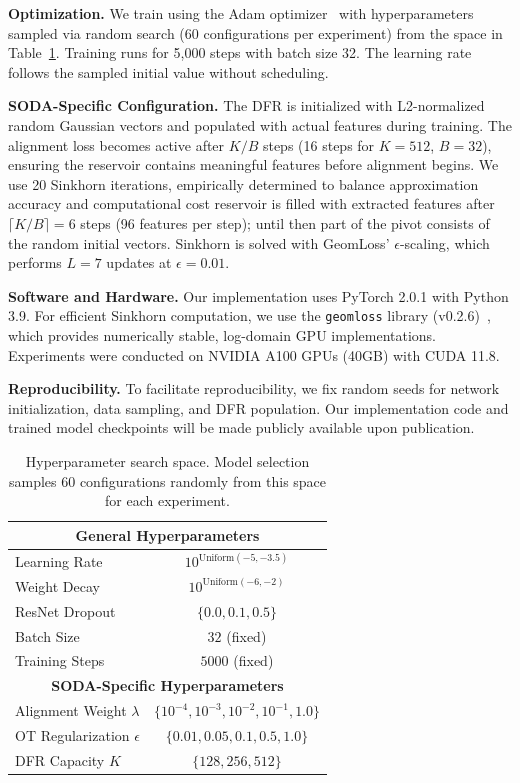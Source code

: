 \documentclass[preprint,12pt]{elsarticle}
\providecommand{\DIFadd}[1]{{\protect\color{blue} \sf #1}} %
\providecommand{\DIFdel}[1]{{\protect\color{red} \scriptsize #1}} %
\providecommand{\DIFaddbegin}{} %
\providecommand{\DIFaddend}{} %
\providecommand{\DIFdelbegin}{} %
\providecommand{\DIFdelend}{} %
\newcommand{\DIFscaledelfig}{0.5}
\newlength{\DIFdelgraphicswidth} %
\newlength{\DIFdelgraphicsheight} %
\newcommand{\DIFaddincludegraphics}[2][]{{\color{blue}\fbox{\DIFOincludegraphics[#1]{#2}}}} %
\newcommand{\DIFdelincludegraphics}[2][]{%
\sbox{\DIFdelgraphicsbox}{\DIFOincludegraphics[#1]{#2}}%
\settoboxwidth{\DIFdelgraphicswidth}{\DIFdelgraphicsbox} %
\settoboxtotalheight{\DIFdelgraphicsheight}{\DIFdelgraphicsbox} %
\scalebox{\DIFscaledelfig}{%
\parbox[b]{\DIFdelgraphicswidth}{\usebox{\DIFdelgraphicsbox}\\[-\baselineskip] \rule{\DIFdelgraphicswidth}{0em}}\llap{\resizebox{\DIFdelgraphicswidth}{\DIFdelgraphicsheight}{%
\setlength{\unitlength}{\DIFdelgraphicswidth}%
\begin{picture}(1,1)%
\thicklines\linethickness{2pt} %
{\color[rgb]{1,0,0}\put(0,0){\framebox(1,1){}}}%
{\color[rgb]{1,0,0}\put(0,0){\line( 1,1){1}}}%
{\color[rgb]{1,0,0}\put(0,1){\line(1,-1){1}}}%
\end{picture}%
}\hspace*{3pt}}} %
} %
\DeclareRobustCommand{\DIFaddbegin}{\DIFOaddbegin \let\includegraphics\DIFaddincludegraphics} %
\DeclareRobustCommand{\DIFaddend}{\DIFOaddend \let\includegraphics\DIFOincludegraphics} %
\DeclareRobustCommand{\DIFdelbegin}{\DIFOdelbegin \let\includegraphics\DIFdelincludegraphics} %
\DeclareRobustCommand{\DIFdelend}{\DIFOaddend \let\includegraphics\DIFOincludegraphics} %
\begin{document}
\textbf{Optimization.} We train using the Adam optimizer~\citep{kingma2014adam} with hyperparameters sampled via random search (60 configurations per experiment) from the space in Table~\ref{tab:hparams}. Training runs for 5,000 steps with batch size 32. The learning rate follows the sampled initial value without scheduling.
\begin{sloppypar} 
\textbf{SODA-Specific Configuration.} The DFR is initialized with L2-normalized random Gaussian vectors and populated with actual features during training. The \DIFdelbegin \DIFdel{alignment loss becomes active after $K/B$ steps (16 steps for $K=512$, $B=32$), ensuring the reservoir contains meaningful features before alignment begins. We use 20 Sinkhorn iterations, empirically determined to balance approximation accuracy and computational cost}\DIFdelend \DIFaddbegin \DIFadd{reservoir is filled with extracted features after $\lceil K/B\rceil=6$ steps (96 features per step); until then part of the pivot consists of the random initial vectors. Sinkhorn is solved with GeomLoss' $\epsilon$-scaling, which performs $L=7$ updates at $\epsilon=0.01$}\DIFaddend .
\end{sloppypar} 
\textbf{Software and Hardware.} Our implementation uses PyTorch 2.0.1 with Python 3.9. For efficient Sinkhorn computation, we use the \texttt{geomloss} library (v0.2.6)~\citep{feydy2019interpolating}, which provides numerically stable, log-domain GPU implementations. Experiments were conducted on NVIDIA A100 GPUs (40GB) with CUDA 11.8.

\textbf{Reproducibility.} To facilitate reproducibility, we fix random seeds for network initialization, data sampling, and DFR population. Our implementation code and trained model checkpoints will be made publicly available upon publication.

\begin{table}[t]
\caption{Hyperparameter search space. Model selection samples 60 configurations randomly from this space for each experiment.}
\label{tab:hparams}
\centering
\small
\renewcommand{\arraystretch}{1.1}
\begin{tabular}{lc}
\toprule
\multicolumn{2}{c}{\textbf{General Hyperparameters}} \\
\midrule
Learning Rate & $10^{\text{Uniform}(-5, -3.5)}$ \\
Weight Decay & $10^{\text{Uniform}(-6, -2)}$ \\
ResNet Dropout & $\{0.0, 0.1, 0.5\}$ \\
Batch Size & $32$ (fixed) \\
Training Steps & $5000$ (fixed) \\
\midrule
\multicolumn{2}{c}{\textbf{SODA-Specific Hyperparameters}} \\
\midrule
Alignment Weight $\lambda$ & $\{10^{-4}, 10^{-3}, 10^{-2}, 10^{-1}, 1.0\}$ \\
OT Regularization $\epsilon$ & $\{0.01, 0.05, 0.1, 0.5, 1.0\}$ \\
DFR Capacity $K$ & $\{128, 256, 512\}$ \\
\bottomrule
\end{tabular}
\end{table}
\end{document}
